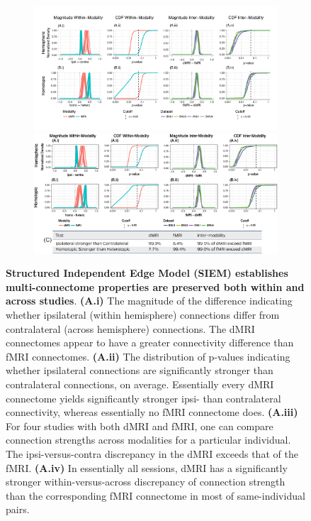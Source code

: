 \begin{figure}[t!]
\centering
\begin{subfigure}[h]{\textwidth}
\includegraphics[width=\textwidth]{./figs/figure_siem.pdf}
\includegraphics[width=\textwidth]{./figs/table_siem.pdf}
\end{subfigure}
\caption{\textbf{Structured Independent Edge Model  (SIEM) establishes multi-connectome properties are preserved both within and across studies}.
\textbf{(A.i)} The magnitude of the difference indicating whether ipsilateral (within hemisphere) connections differ from contralateral (across hemisphere) connections. The dMRI connectomes appear to have a greater connectivity difference than fMRI connectomes.
\textbf{(A.ii)} The distribution of p-values indicating whether ipsilateral connections are significantly stronger than contralateral connections, on average.  Essentially every dMRI connectome yields significantly stronger ipsi- than contralateral connectivity, whereas essentially no fMRI connectome does.  
\textbf{(A.iii)} For four studies with both dMRI and fMRI, one can compare connection strengths across modalities for a particular individual. The ipsi-versus-contra discrepancy in the dMRI exceeds that of the fMRI.
\textbf{(A.iv)}  In essentially all sessions, dMRI has a significantly stronger within-versus-across discrepancy of connection strength than the corresponding fMRI connectome in most of same-individual pairs. 
}
\end{figure}
